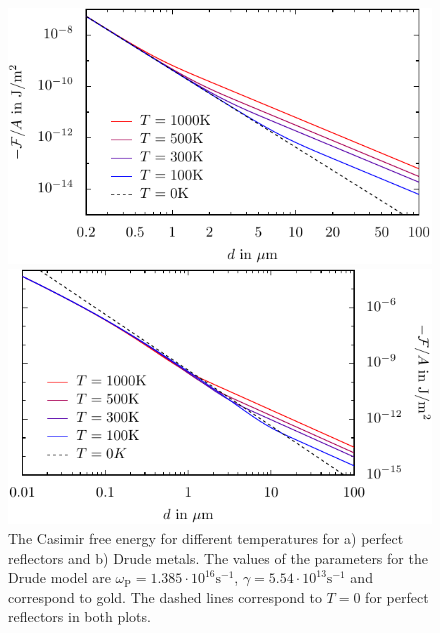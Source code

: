 \begin{figure}
\begin{minipage}[b]{.5\linewidth}
\centering
\includegraphics[scale=0.76]{plots/pp/pp_perf.pdf}
\end{minipage}%
\begin{minipage}[b]{.5\linewidth}
\centering
\includegraphics[scale=0.76]{plots/pp/pp_gold.pdf}
\end{minipage}
\caption{The Casimir free energy for different temperatures for a) perfect
reflectors and b) Drude metals. The values of the parameters for the Drude
model are $\omega_\text{P}=1.385\cdot10^{16}\mathrm{s}^{-1}$,
$\gamma=5.54\cdot10^{13}\mathrm{s}^{-1}$ and correspond to gold. The dashed
lines correspond to $T=0$ for perfect reflectors in both plots.}
\label{fig:scattering_pp_perf_gold}
\end{figure}


